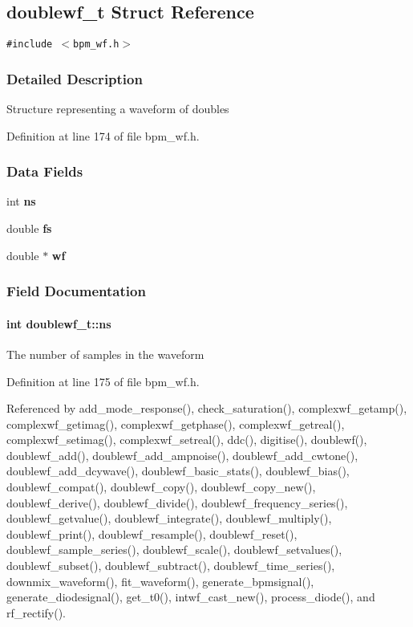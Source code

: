 \subsection{doublewf\_\-t Struct Reference}
\label{structdoublewf__t}
{\tt \#include $<$bpm\_\-wf.h$>$}



\subsubsection{Detailed Description}
Structure representing a waveform of doubles 

Definition at line 174 of file bpm\_\-wf.h.\subsubsection*{Data Fields}
\begin{CompactItemize}
\item 
int {\bf ns}
\item 
double {\bf fs}
\item 
double $\ast$ {\bf wf}
\end{CompactItemize}


\subsubsection{Field Documentation}
\paragraph[ns]{\setlength{\rightskip}{0pt plus 5cm}int {\bf doublewf\_\-t::ns}}\hfill\label{structdoublewf__t_6d4a8d00c105aeb8f484a2d6dbb63459}


The number of samples in the waveform 

Definition at line 175 of file bpm\_\-wf.h.

Referenced by add\_\-mode\_\-response(), check\_\-saturation(), complexwf\_\-getamp(), complexwf\_\-getimag(), complexwf\_\-getphase(), complexwf\_\-getreal(), complexwf\_\-setimag(), complexwf\_\-setreal(), ddc(), digitise(), doublewf(), doublewf\_\-add(), doublewf\_\-add\_\-ampnoise(), doublewf\_\-add\_\-cwtone(), doublewf\_\-add\_\-dcywave(), doublewf\_\-basic\_\-stats(), doublewf\_\-bias(), doublewf\_\-compat(), doublewf\_\-copy(), doublewf\_\-copy\_\-new(), doublewf\_\-derive(), doublewf\_\-divide(), doublewf\_\-frequency\_\-series(), doublewf\_\-getvalue(), doublewf\_\-integrate(), doublewf\_\-multiply(), doublewf\_\-print(), doublewf\_\-resample(), doublewf\_\-reset(), doublewf\_\-sample\_\-series(), doublewf\_\-scale(), doublewf\_\-setvalues(), doublewf\_\-subset(), doublewf\_\-subtract(), doublewf\_\-time\_\-series(), downmix\_\-waveform(), fit\_\-waveform(), generate\_\-bpmsignal(), generate\_\-diodesignal(), get\_\-t0(), intwf\_\-cast\_\-new(), process\_\-diode(), and rf\_\-rectify().
